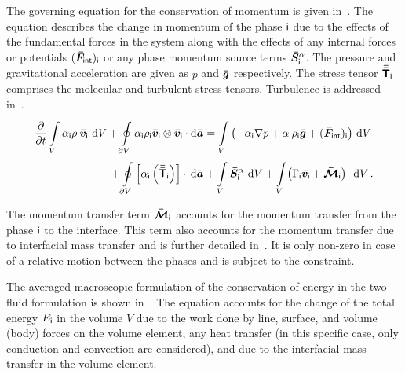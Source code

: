 The governing equation for the conservation of momentum is given in~.
 The equation describes the change in momentum of the phase \(\mathsf {i}\) due to the effects of the
 fundamental forces in the system along with the effects of any internal forces or potentials \((\bm{\bar{F}}_{\mathsf {int}})_{\mathsf {i}}\)
 or any phase momentum source terms \(\bm{\bar{S}}_{\mathsf {i}}^{\alpha}\). The pressure and gravitational acceleration are given as \(p\) and \(\bm{\bar{g}}\) respectively.
 The stress tensor \({\bm{\bar{\bar{\mathsf{T}}}}}_{\mathsf {i}}\) comprises the molecular and turbulent stress tensors. Turbulence
 is addressed in~.
\begin{equation}\label{eq:emp-mom}
\begin{split}
\pderiv{}{t}
\integ{V}{} \alpha_{\ind{i}} \rho_{\ind{i}} \vect{v}_{\ind{i}} \,\diff{V}
+ \ointeg{\partial V}{} \alpha_{\ind{i}} \rho_{\ind{i}} \vect{v}_{\ind{i}} \otimes \vect{v}_{\ind{i}} \cdot \diff{\vect{a}}
& =  
\integ{V}{} \left(-\alpha_{\ind{i}} \nabla p 
+ \alpha_{\ind{i}} \rho_{\ind{i}} \vect{g}
+ (\vect{F}_{\ind{int}})_{\ind{i}} \right) \,\diff{V}\\
+ \ointeg{\partial V}{} \left[ \alpha_{\ind{i}} \left( \tens{T}_{\ind{i}}\right) \right] \cdot \,\diff{\vect{a}} 
&+ \integ{V}{} \vect{S}^{\alpha}_{\ind{i}} \,\diff{V}
+ \integ{V}{} \bigl(\Gamma_{\ind{i}} \vect{v}_{\ind{i}} + \vect{\mathcal{M}}_{\ind{i}}\bigr)  \,\diff{V}\,.
\end{split}
\end{equation}

The momentum transfer term \(\bm{\bar{\mathcal{M}}}_{\mathsf {i}}\) accounts for the momentum transfer from 
 the phase \(\mathsf {i}\) to the interface. This term also accounts for the momentum transfer
 due to interfacial mass transfer and is further detailed in~. It is only non-zero in case 
 of a relative motion between the phases and is subject to the constraint.

The averaged macroscopic formulation of the conservation of energy in the two-fluid formulation is 
 shown in~. The equation accounts for the change of the total energy \(E_{\mathsf {i}}\) in the 
 volume \(V\) due to the work done by line, surface, and volume (body) forces on the volume element,
 any heat transfer (in this specific case, only conduction and convection are considered),
 and due to the interfacial mass transfer in the volume element. 
 
